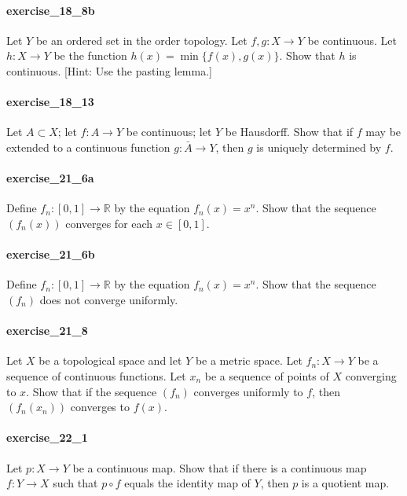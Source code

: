 \documentclass{article}
\begin{document}
\paragraph{exercise\_18\_8b} Let $Y$ be an ordered set in the order topology. Let $f, g: X \rightarrow Y$ be continuous. Let $h: X \rightarrow Y$ be the function $h(x)=\min \{f(x), g(x)\}.$ Show that $h$ is continuous. [Hint: Use the pasting lemma.]

\paragraph{exercise\_18\_13} Let $A \subset X$; let $f: A \rightarrow Y$ be continuous; let $Y$ be Hausdorff. Show that if $f$ may be extended to a continuous function $g: \bar{A} \rightarrow Y$, then $g$ is uniquely determined by $f$.

\paragraph{exercise\_21\_6a} Define $f_{n}:[0,1] \rightarrow \mathbb{R}$ by the equation $f_{n}(x)=x^{n}$. Show that the sequence $\left(f_{n}(x)\right)$ converges for each $x \in[0,1]$.

\paragraph{exercise\_21\_6b} Define $f_{n}:[0,1] \rightarrow \mathbb{R}$ by the equation $f_{n}(x)=x^{n}$. Show that the sequence $\left(f_{n}\right)$ does not converge uniformly.

\paragraph{exercise\_21\_8} Let $X$ be a topological space and let $Y$ be a metric space. Let $f_{n}: X \rightarrow Y$ be a sequence of continuous functions. Let $x_{n}$ be a sequence of points of $X$ converging to $x$. Show that if the sequence $\left(f_{n}\right)$ converges uniformly to $f$, then $\left(f_{n}\left(x_{n}\right)\right)$ converges to $f(x)$.

\paragraph{exercise\_22\_1} Let $p: X \rightarrow Y$ be a continuous map. Show that if there is a continuous map $f: Y \rightarrow X$ such that $p \circ f$ equals the identity map of $Y$, then $p$ is a quotient map.
\end{document}
